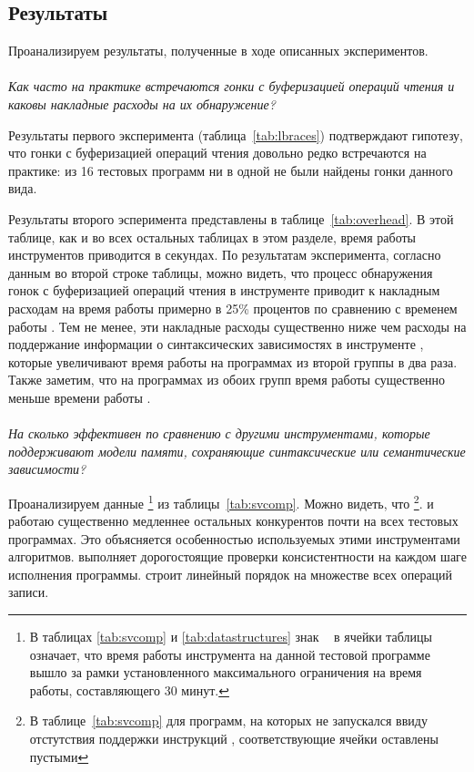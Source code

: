 \subsection*{Результаты}

Проанализируем результаты, полученные в ходе описанных экспериментов.

\paragraph{}
\textit{Как часто на практике встречаются гонки с буферизацией операций 
чтения и каковы накладные расходы на их обнаружение?}

Результаты первого эксперимента (таблица~\ref{tab:lbraces})
подтверждают гипотезу, что гонки с буферизацией операций чтения 
довольно редко встречаются на практике: 
из 16 тестовых программ ни в одной не были найдены гонки данного вида.



Результаты второго эсперимента представлены в таблице~\ref{tab:overhead}.
В этой таблице, как и во всех остальных таблицах в этом разделе, 
время работы инструментов приводится в секундах.  
По результатам эксперимента, согласно данным во второй строке таблицы, 
можно видеть, что процесс обнаружения гонок с буферизацией операций чтения 
в инструменте \wmc приводит к накладным расходам на время работы 
примерно в 25\% процентов по сравнению с временем работы \genmc.
Тем не менее, эти накладные расходы существенно ниже чем 
расходы на поддержание информации о синтаксических зависимостях
в инструменте \hmc, которые увеличивают время работы \hmc
на программах из второй группы в два раза.  
Также заметим, что на программах из обоих групп
время работы \wmc существенно меньше времени работы \hmc. 



\paragraph{}
\textit{На сколько эффективен \wmc по сравнению с другими инструментами, 
которые поддерживают модели памяти, сохраняющие синтаксические 
или семантические зависимости?}

Проанализируем данные
\footnote{В таблицах \ref{tab:svcomp} и \ref{tab:datastructures}
знак \timeoutNoSpc~ в ячейки таблицы означает, что 
время работы инструмента на данной тестовой программе 
вышло за рамки установленного максимального ограничения на время работы,
составляющего 30 минут.}
из таблицы~\ref{tab:svcomp}. 
Можно видеть, что \Nidhugg%
\footnote{В таблице~\ref{tab:svcomp} для программ, 
на которых \Nidhugg не запускался ввиду отстутствия 
поддержки инструкций \RMW, соответствующие ячейки оставлены пустыми}.
и \rmem работаю существенно медленнее остальных 
конкурентов почти на всех тестовых программах. 
Это объясняется особенностью используемых этими инструментами алгоритмов.
\Nidhugg выполняет дорогостоящие проверки консистентности
на каждом шаге исполнения программы.
\rmem строит линейный порядок на множестве всех операций записи.

